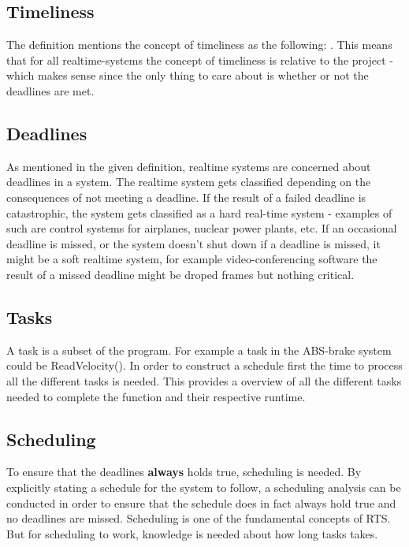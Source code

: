 \subsection{Timeliness}
The definition mentions the concept of timeliness as the following:
. This means that for all realtime-systems the concept of
timeliness is relative to the project - which makes sense since the only thing
to care about is whether or not the deadlines are met.

\subsection{Deadlines}
As mentioned in the given definition, realtime systems are concerned about
deadlines in a system.
The realtime system gets classified depending on the consequences of not
meeting a deadline. If the result of a failed deadline is catastrophic, the
system gets classified as a hard real-time system - examples of such are control
systems for airplanes, nuclear power plants, etc.
If an occasional deadline is missed, or the system doesn't shut down if a
deadline is missed, it might be a soft realtime system, for example
video-conferencing software the result of a missed deadline might be droped
frames but nothing critical.

\subsection{Tasks}
A task is a subset of the program. For example a task in the ABS-brake system
could be ReadVelocity(). In order to construct a schedule first the time to
process all the different tasks is needed. This provides a overview of all the
different tasks needed to complete the function and their respective runtime.

\subsection{Scheduling}
To ensure that the deadlines \textbf{always} holds true, scheduling is needed.
By explicitly stating a schedule for the system to follow, a scheduling analysis
can be conducted in order to ensure that the schedule does in fact always hold
true and no deadlines are missed. Scheduling is one of the
fundamental concepts of RTS. But for scheduling to work, knowledge is needed
about how long tasks takes. 
